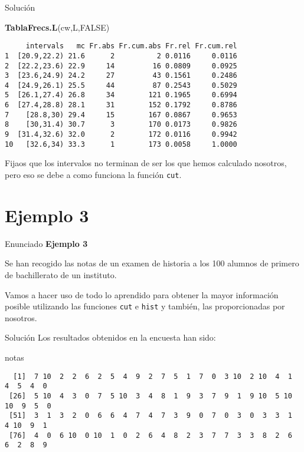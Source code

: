 \documentclass[
  ignorenonframetext,
]{beamer}
\newenvironment{Shaded}{\begin{snugshade}}{\end{snugshade}}
\newcommand{\KeywordTok}[1]{\textcolor[rgb]{0.13,0.29,0.53}{\textbf{#1}}}
\newcommand{\NormalTok}[1]{#1}
\newcommand{\OtherTok}[1]{\textcolor[rgb]{0.56,0.35,0.01}{#1}}
\begin{document}
\begin{frame}[fragile]{Solución}
\protect\hypertarget{soluciuxf3n-14}{}
\begin{Shaded}
\begin{Highlighting}[]
\KeywordTok{TablaFrecs.L}\NormalTok{(cw,L,}\OtherTok{FALSE}\NormalTok{)}
\end{Highlighting}
\end{Shaded}

\begin{verbatim}
     intervals   mc Fr.abs Fr.cum.abs Fr.rel Fr.cum.rel
1  [20.9,22.2) 21.6      2          2 0.0116     0.0116
2  [22.2,23.6) 22.9     14         16 0.0809     0.0925
3  [23.6,24.9) 24.2     27         43 0.1561     0.2486
4  [24.9,26.1) 25.5     44         87 0.2543     0.5029
5  [26.1,27.4) 26.8     34        121 0.1965     0.6994
6  [27.4,28.8) 28.1     31        152 0.1792     0.8786
7    [28.8,30) 29.4     15        167 0.0867     0.9653
8    [30,31.4) 30.7      3        170 0.0173     0.9826
9  [31.4,32.6) 32.0      2        172 0.0116     0.9942
10   [32.6,34) 33.3      1        173 0.0058     1.0000
\end{verbatim}

Fijaos que los intervalos no terminan de ser los que hemos calculado
nosotros, pero eso se debe a como funciona la función \texttt{cut}.
\end{frame}

\hypertarget{ejemplo-3}{%
\section{Ejemplo 3}\label{ejemplo-3}}

\begin{frame}[fragile]{Enunciado}
\protect\hypertarget{enunciado-2}{}
\textbf{Ejemplo 3}

Se han recogido las notas de un examen de historia a los 100 alumnos de
primero de bachillerato de un instituto.

Vamos a hacer uso de todo lo aprendido para obtener la mayor información
posible utilizando las funciones \texttt{cut} e \texttt{hist} y también,
las proporcionadas por nosotros.
\end{frame}

\begin{frame}[fragile]{Solución}
\protect\hypertarget{soluciuxf3n-15}{}
Los resultados obtenidos en la encuesta han sido:

\begin{Shaded}
\begin{Highlighting}[]
\NormalTok{notas}
\end{Highlighting}
\end{Shaded}

\begin{verbatim}
  [1]  7 10  2  2  6  2  5  4  9  2  7  5  1  7  0  3 10  2 10  4  1  4  5  4  0
 [26]  5 10  4  3  0  7  5 10  3  4  8  1  9  3  7  9  1  9 10  5 10 10  9  5  0
 [51]  3  1  3  2  0  6  6  4  7  4  7  3  9  0  7  0  3  0  3  3  1  4 10  9  1
 [76]  4  0  6 10  0 10  1  0  2  6  4  8  2  3  7  7  3  3  8  2  6  6  2  8  9
\end{verbatim}
\end{frame}
\end{document}
